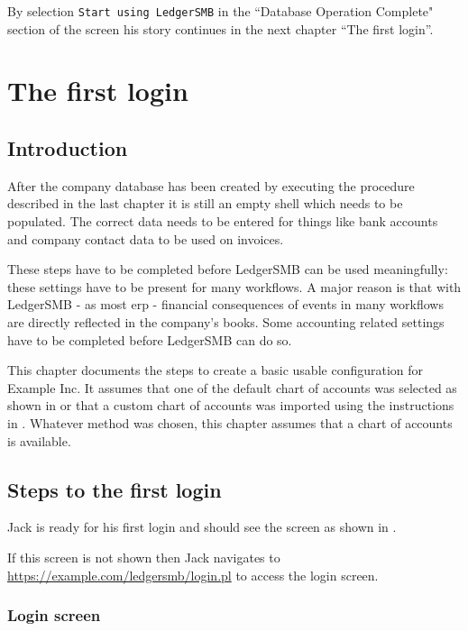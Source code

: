 By selection \texttt{Start using LedgerSMB} in the ``Database Operation Complete" section of the screen his story continues in
the next chapter ``The first login''.

\chapter{The first login}
\label{cha-first-login}

\section{Introduction}
\label{sec-first-login-introduction}

After the company database has been created by executing the procedure described in the last
chapter it is still an empty shell which needs to be populated. The correct data
needs to be entered for things like bank accounts and company contact data to be used
on invoices.

These steps have to be completed before LedgerSMB can be used meaningfully: these
settings have to be present for many workflows. A major reason is that with LedgerSMB
- as most \gls{erp} - financial
consequences of events in many workflows are directly reflected in the company's books.
Some accounting related settings have to be completed before LedgerSMB can do so.

This chapter documents the steps to create a basic usable configuration for Example Inc. 
It assumes that
one of the default chart of accounts was selected as shown in  or 
that a custom chart of accounts was imported using the instructions in . 
Whatever method was chosen, this chapter assumes that a chart of accounts is available.

\section{Steps to the first login}
\label{sec-first-login-ramp-up}

Jack is ready for his first login and should see the screen as shown in .

If this screen is not shown then Jack navigates to 
\url{https://example.com/ledgersmb/login.pl} to access the login screen.

\subsection{Login screen}
\label{subsec-first-login-screen}

